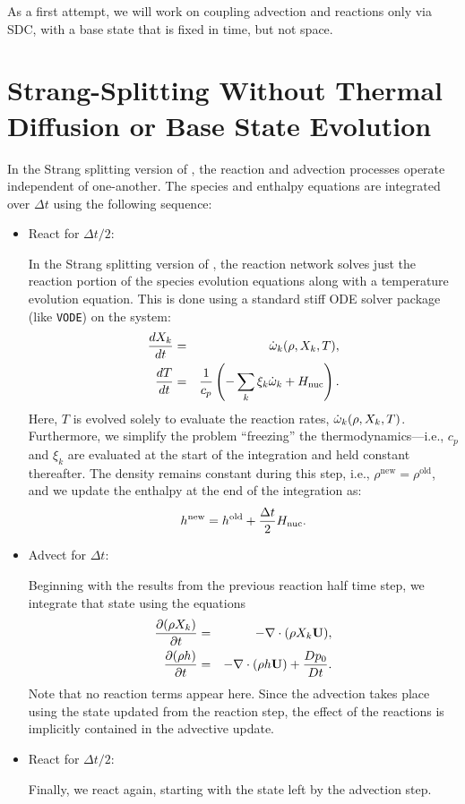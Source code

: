 As a first attempt, we will work on coupling advection and reactions only
via SDC, with a base state that is fixed in time, but not space.

\section{Strang-Splitting Without Thermal Diffusion or Base State Evolution}

In the Strang splitting version of \maestro, the reaction and advection
processes operate independent of one-another.  The species and
enthalpy equations are integrated over $\Delta t$ using the following
sequence:

\begin{itemize}

\item React for $\Delta t/2$:

In the Strang splitting version of \maestro, the reaction network solves just
the reaction portion of the species evolution equations along with a
temperature evolution equation.  This is done using a standard stiff ODE solver
package (like {\tt VODE}) on the system:
\begin{eqnarray}
\frac{dX_k}{dt} &=& \dot{\omega}_k(\rho,X_k,T), \\
\frac{dT}{dt}   &=& 
    \frac{1}{c_p} \left ( -\sum_k \xi_k  \dot{\omega}_k  + {H_{\rm nuc}} \right ).
\end{eqnarray}
Here, $T$ is evolved solely to evaluate the reaction rates,
$\dot{\omega}_k(\rho,X_k,T)$.  Furthermore, we simplify the problem
``freezing'' the thermodynamics---i.e., $c_p$ and $\xi_k$ are evaluated at the
start of the integration and held constant thereafter.
The density remains constant during this step, i.e., 
$\rho^\mathrm{new} = \rho^\mathrm{old}$, and we
update the enthalpy at the end of the integration as:
\begin{equation}
h^\mathrm{new} = h^\mathrm{old} + \frac{\Delta t}{2} {H_{\rm nuc}}.
\end{equation}

\item Advect for $\Delta t$:

Beginning with the results from the previous reaction half time step, we integrate
that state using the equations
\begin{eqnarray}
\frac{\partial(\rho X_k)}{\partial t} &=& 
    -\nabla\cdot(\rho X_k{\bf U}), \\
\frac{\partial(\rho h)}{\partial t} &=& 
    -\nabla\cdot(\rho h{\bf U}) + \frac{Dp_0}{Dt}.
\end{eqnarray}
Note that no reaction terms appear here.  Since the advection
takes place using the state updated from the reaction step, the effect
of the reactions is implicitly contained in the advective update.

\item React for $\Delta t/2$:

Finally, we react again, starting with the state left by the advection
step.

\end{itemize}

